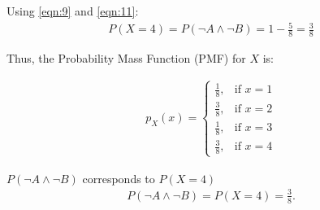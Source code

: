 \documentclass[journal]{IEEEtran}
\begin{document}
Using \eqref{eqn:9} and \eqref{eqn:11}:
\begin{align}
    P(X = 4) = P(\neg A \land \neg B) = 1 - \frac{5}{8} = \frac{3}{8}
\end{align}

Thus, the Probability Mass Function (PMF) for $X$ is:

\begin{align}
    p_X(x) =
    \begin{cases}
        \frac{1}{8}, & \text{if } x = 1 \\
        \frac{3}{8}, & \text{if } x = 2 \\
        \frac{1}{8}, & \text{if } x = 3 \\
        \frac{3}{8}, & \text{if } x = 4
        \end{cases}
\end{align}

$P(\neg A \land \neg B)$ corresponds to $P(X = 4)$
\begin{align}
    P(\neg A \land \neg B) = P(X = 4) = \frac{3}{8}.
\end{align}
\end{document}
